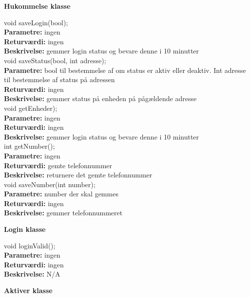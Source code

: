 \vspace*{3\baselineskip}
{\centering
\textbf{Hukommelse klasse}\par
}

void saveLogin(bool); \\
\textbf{Parametre:} ingen \\
\textbf{Returværdi:} ingen \\
\textbf{Beskrivelse:} gemmer login status og bevare denne i 10 minutter \\

void saveStatus(bool, int adresse); \\
\textbf{Parametre:} bool til bestemmelse af om status er aktiv eller deaktiv. Int adresse til bestemmelse af status på adressen \\
\textbf{Returværdi:} ingen \\
\textbf{Beskrivelse:} gemmer status på enheden på pågældende adresse \\

void getEnheder); \\
\textbf{Parametre:} ingen \\
\textbf{Returværdi:} ingen \\
\textbf{Beskrivelse:} gemmer login status og bevare denne i 10 minutter \\

int getNumber(); \\
\textbf{Parametre:} ingen \\
\textbf{Returværdi:} gemte telefonnummer \\
\textbf{Beskrivelse:} returnere det gemte telefonnummer \\

void saveNumber(int number); \\
\textbf{Parametre:} number der skal gemmes \\
\textbf{Returværdi:} ingen \\
\textbf{Beskrivelse:} gemmer telefonnummeret \\

{\centering 
\textbf{Login klasse}\par
}

void loginValid(); \\
\textbf{Parametre:} ingen  \\
\textbf{Returværdi:} ingen \\
\textbf{Beskrivelse:} N/A \\

{\centering 
\textbf{Aktiver klasse}\par
}


